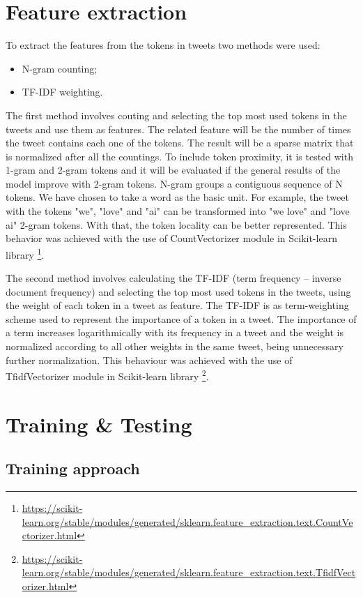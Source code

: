 \documentclass[journal]{IEEEtran}
\begin{document}
\section{Feature extraction}
To extract the features from the tokens in tweets two methods were used:
\begin{itemize}
\item N-gram counting;
\item TF-IDF weighting.
\end{itemize}

The first method involves couting and selecting the top most used tokens in the tweets and use them as features. The related feature will be the number of times the tweet contains each one of the tokens. The result will be a sparse matrix that is normalized after all the countings. To include token proximity, it is tested with 1-gram and 2-gram tokens and it will be evaluated if the general results of the model improve with 2-gram tokens. N-gram groups a contiguous sequence of N tokens. We have chosen to take a word as the basic unit. For example, the tweet with the tokens "we", "love" and "ai" can be transformed into "we love" and "love ai" 2-gram tokens. With that, the token locality can be better represented. This behavior was achieved with the use of CountVectorizer module in Scikit-learn library \footnote{\url{https://scikit-learn.org/stable/modules/generated/sklearn.feature_extraction.text.CountVectorizer.html}}.

The second method involves calculating the TF-IDF (term frequency – inverse document frequency) and selecting the top most used tokens in the tweets, using the weight of each token in a tweet as feature. The TF-IDF is as term-weighting scheme used to represent the importance of a token in a tweet. The importance of a term increases logarithmically with its frequency in a tweet and the weight is normalized according to all other weights in the same tweet, being unnecessary further normalization. This behaviour was achieved with the use of TfidfVectorizer module in Scikit-learn library \footnote{\url{https://scikit-learn.org/stable/modules/generated/sklearn.feature_extraction.text.TfidfVectorizer.html}}.

\section{Training \& Testing}

\subsection{Training approach}
\end{document}

